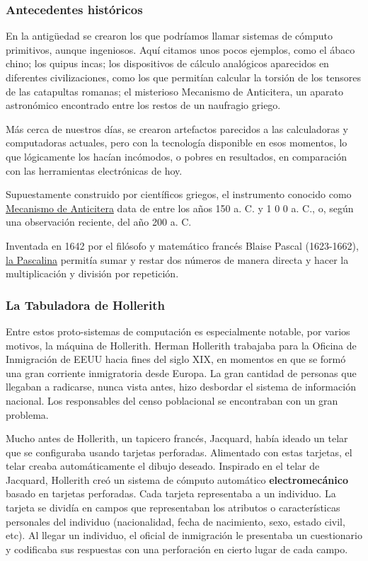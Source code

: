 \documentclass[spanish,A4,]{article}
\begin{document}
\subsubsection{Antecedentes
históricos}\label{antecedentes-histuxf3ricos}

En la antigüedad se crearon los que podríamos llamar sistemas de cómputo
primitivos, aunque ingeniosos. Aquí citamos unos pocos ejemplos, como el
ábaco chino; los quipus incas; los dispositivos de cálculo analógicos
aparecidos en diferentes civilizaciones, como los que permitían calcular
la torsión de los tensores de las catapultas romanas; el misterioso
Mecanismo de Anticitera, un aparato astronómico encontrado entre los
restos de un naufragio griego.

Más cerca de nuestros días, se crearon artefactos parecidos a las
calculadoras y computadoras actuales, pero con la tecnología disponible
en esos momentos, lo que lógicamente los hacían incómodos, o pobres en
resultados, en comparación con las herramientas electrónicas de hoy.

Supuestamente construido por científicos griegos, el instrumento
conocido como
\href{https://es.m.wikipedia.org/wiki/Mecanismo sub de sub Anticitera}{Mecanismo
de Anticitera} data de entre los años 150 a. C. y 1 0 0 a. C., o, según
una observación reciente, del año 200 a. C.

Inventada en 1642 por el filósofo y matemático francés Blaise Pascal
(1623-1662), \href{https://es.m.wikipedia.org/wiki/Pascalina}{la
Pascalina} permitía sumar y restar dos números de manera directa y hacer
la multiplicación y división por repetición.

\subsubsection{La Tabuladora de
Hollerith}\label{la-tabuladora-de-hollerith}

Entre estos proto-sistemas de computación es especialmente notable, por
varios motivos, la máquina de Hollerith. Herman Hollerith trabajaba para
la Oficina de Inmigración de EEUU hacia fines del siglo XIX, en momentos
en que se formó una gran corriente inmigratoria desde Europa. La gran
cantidad de personas que llegaban a radicarse, nunca vista antes, hizo
desbordar el sistema de información nacional. Los responsables del censo
poblacional se encontraban con un gran problema.

Mucho antes de Hollerith, un tapicero francés, Jacquard, había ideado un
telar que se configuraba usando tarjetas perforadas. Alimentado con
estas tarjetas, el telar creaba automáticamente el dibujo deseado.
Inspirado en el telar de Jacquard, Hollerith creó un sistema de cómputo
automático \textbf{electromecánico} basado en tarjetas perforadas. Cada
tarjeta representaba a un individuo. La tarjeta se dividía en campos que
representaban los atributos o características personales del individuo
(nacionalidad, fecha de nacimiento, sexo, estado civil, etc). Al llegar
un individuo, el oficial de inmigración le presentaba un cuestionario y
codificaba sus respuestas con una perforación en cierto lugar de cada
campo.
\end{document}
